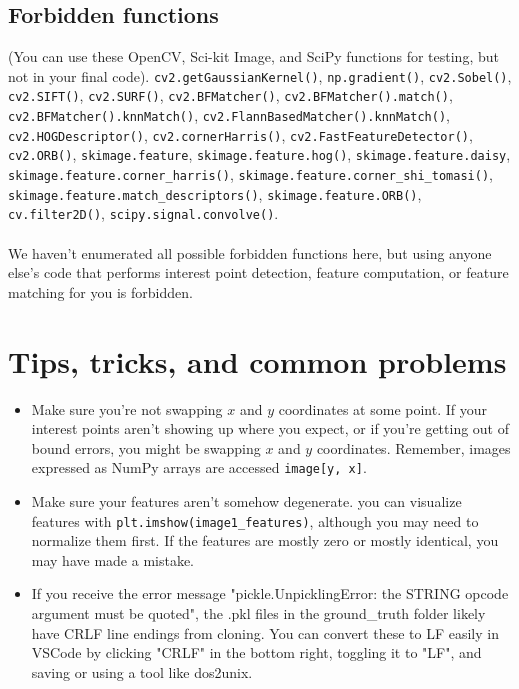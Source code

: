 \documentclass{article}
\begin{document}
\subsection*{Forbidden functions}
(You can use these OpenCV, Sci-kit Image, and SciPy functions for testing, but not in your final code). \lstinline{cv2.getGaussianKernel()}, \lstinline{np.gradient()}, \lstinline{cv2.Sobel()}, \lstinline{cv2.SIFT()}, \lstinline{cv2.SURF()}, \lstinline{cv2.BFMatcher()}, \lstinline{cv2.BFMatcher().match()}, \lstinline{cv2.BFMatcher().knnMatch()}, \lstinline{cv2.FlannBasedMatcher().knnMatch()}, \lstinline{cv2.HOGDescriptor()}, \lstinline{cv2.cornerHarris()}, \lstinline{cv2.FastFeatureDetector()}, \lstinline{cv2.ORB()}, \lstinline{skimage.feature}, \lstinline{skimage.feature.hog()}, \lstinline{skimage.feature.daisy}, \lstinline{skimage.feature.corner_harris()}, \lstinline{skimage.feature.corner_shi_tomasi()}, \lstinline{skimage.feature.match_descriptors()}, \lstinline{skimage.feature.ORB()},
\lstinline{cv.filter2D()},  \lstinline{scipy.signal.convolve()}.
\\
\\
We haven't enumerated all possible forbidden functions here, but using anyone else's code that performs interest point detection, feature computation, or feature matching for you is forbidden.


\section*{Tips, tricks, and common problems}
\begin{itemize}
    \item{Make sure you're not swapping $x$ and $y$ coordinates at some point. If your interest points aren't showing up where you expect, or if you're getting out of bound errors, you might be swapping $x$ and $y$ coordinates. Remember, images expressed as NumPy arrays are accessed \lstinline{image[y, x]}.}
    \item{Make sure your features aren't somehow degenerate. you can visualize features with \lstinline{plt.imshow(image1_features)}, although you may need to normalize them first. If the features are mostly zero or mostly identical, you may have made a mistake.}
    \item{If you receive the error message "pickle.UnpicklingError: the STRING opcode argument must be quoted", the .pkl files in the ground\_truth folder likely have CRLF line endings from cloning. You can convert these to LF easily in VSCode by clicking "CRLF" in the bottom right, toggling it to "LF", and saving or using a tool like dos2unix.}

\end{itemize}
\end{document}
